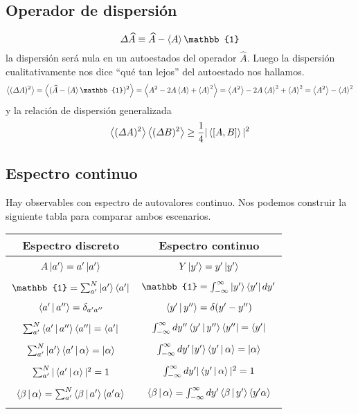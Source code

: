 \documentclass[10pt,oneside]{CBFT_book}
\begin{document}

\subsection{Operador de dispersión}

\[
	\Delta \widehat{A} \equiv \widehat{A} - \Braket{A}\mathbb{1}
\]
la dispersión será nula en un autoestados del operador $\widehat{A}$. Luego la dispersión cualitativamente nos dice 
``qué tan lejos'' del autoestado nos hallamos.
\[
	\Braket{(\Delta A)^2} = \Braket{(\widehat{A} - \Braket{A}\mathbb{1})^2} =
	\Braket{ A^2 - 2A\Braket{A} + \Braket{A}^2 } = \Braket{A^2} - 2A\Braket{A}^2 + \Braket{A}^2 =
	\Braket{A^2} - \Braket{A}^2
\]
y la relación de dispersión generalizada
\[
	\Braket{(\Delta A)^2} \Braket{(\Delta B)^2} \geq \frac{1}{4}|\Braket{[ A,B ]}|^2
\]

\subsection{Espectro continuo}

Hay observables con espectro de autovalores continuo.
Nos podemos construir la siguiente tabla para comparar ambos escenarios.

\begin{tabular}{|c|c|}
\hline 
Espectro discreto & Espectro continuo \\
\hline
  & \\
  $A\Ket{a'}=a'\ket{a'}$ & $Y\Ket{y'}=y'\ket{y'}$ \\
  & \\
  $\mathbb{1} = \sum_{a' }^N \Ket{a'}\Bra{a'} $ & $\mathbb{1} = \int_{-\infty}^ {\infty} \Ket{y'}\Bra{y'} dy' $ \\
  & \\
  $\Braket{a'|a''} = \delta_{a' a''}$ & $\Braket{y'|y''} = \delta(y'-y'')$ \\
  & \\
  $ \sum_{a' }^N \Braket{a'|a''}\Bra{a''} = \Bra{a'}$ & $ \int_{-\infty}^\infty dy'' \Braket{y'|y''}\Bra{y''} = 
\Bra{y'}$ \\
  & \\
  $ \sum_{a' }^N \Ket{a'} \Braket{a'|\alpha} =  \Ket{\alpha}$ & $ \int_{-\infty}^\infty dy' \Ket{y'}\Braket{y'|\alpha} 
= \Ket{\alpha}$ \\
  & \\
  $ \sum_{a' }^N |\Braket{a'|\alpha}|^2 = 1$ & $ \int_{-\infty}^\infty dy'|\Braket{y'|\alpha}|^2 = 
1$ \\
  & \\
    $ \Braket{\beta | \alpha}  = \sum_{a' }^N \Braket{\beta|a'}\Braket{a'\alpha}$ & $ \Braket{\beta | \alpha}  = 
\int_{-\infty}^\infty dy' \Braket{\beta|y'}\Braket{y'\alpha}$ \\
  & \\
\hline  
\end{tabular} 
\end{document}
